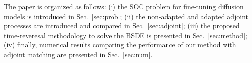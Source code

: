 \documentclass[letterpaper, 10 pt, conference]{ieeeconf}  %
\begin{document}




The paper is organized as follows: (i) the SOC problem for fine-tuning diffusion models is introduced in Sec.~\ref{sec:prob}; (ii) the non-adapted and adapted adjoint processes are introduced and compared in Sec.~\ref{sec:adjoint}; (iii) the proposed time-reveresal methodology to solve the BSDE is presented in Sec.~\ref{sec:method}; (iv) finally, numerical results comparing the performance of our method with adjoint matching are presented in Sec.~\ref{sec:num}.



\end{document}
